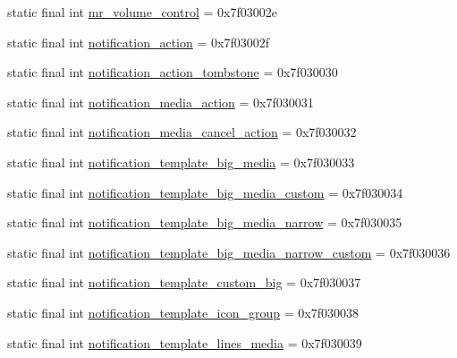 \begin{CompactItemize}
\item 
static final int \hyperlink{classandroid_1_1support_1_1mediacompat_1_1_r_1_1layout_bd3e479579173693faaa0370adeff515}{mr\_\-volume\_\-control} = 0x7f03002e
\item 
static final int \hyperlink{classandroid_1_1support_1_1mediacompat_1_1_r_1_1layout_29c15522984b36895767ca04e42ee8aa}{notification\_\-action} = 0x7f03002f
\item 
static final int \hyperlink{classandroid_1_1support_1_1mediacompat_1_1_r_1_1layout_3faaaaee1a8db772f7153dc113293cde}{notification\_\-action\_\-tombstone} = 0x7f030030
\item 
static final int \hyperlink{classandroid_1_1support_1_1mediacompat_1_1_r_1_1layout_12edbac3524e734d9030eb3c27d2622e}{notification\_\-media\_\-action} = 0x7f030031
\item 
static final int \hyperlink{classandroid_1_1support_1_1mediacompat_1_1_r_1_1layout_2954b200f3e663f1c2e1a43b394c9f36}{notification\_\-media\_\-cancel\_\-action} = 0x7f030032
\item 
static final int \hyperlink{classandroid_1_1support_1_1mediacompat_1_1_r_1_1layout_fdd746cb701ba907544b831af7ba0d37}{notification\_\-template\_\-big\_\-media} = 0x7f030033
\item 
static final int \hyperlink{classandroid_1_1support_1_1mediacompat_1_1_r_1_1layout_1298e724ec87dcc05ac1122d5ba857e9}{notification\_\-template\_\-big\_\-media\_\-custom} = 0x7f030034
\item 
static final int \hyperlink{classandroid_1_1support_1_1mediacompat_1_1_r_1_1layout_0d9d9e6ebfd8ecb552506391a00aac00}{notification\_\-template\_\-big\_\-media\_\-narrow} = 0x7f030035
\item 
static final int \hyperlink{classandroid_1_1support_1_1mediacompat_1_1_r_1_1layout_1168a77f40ed3c9d05cf7045d90b005f}{notification\_\-template\_\-big\_\-media\_\-narrow\_\-custom} = 0x7f030036
\item 
static final int \hyperlink{classandroid_1_1support_1_1mediacompat_1_1_r_1_1layout_8c6c9a9f12c4f255c01595c9e2ab0259}{notification\_\-template\_\-custom\_\-big} = 0x7f030037
\item 
static final int \hyperlink{classandroid_1_1support_1_1mediacompat_1_1_r_1_1layout_ae7b39339a1e8302370f528e52c1ef13}{notification\_\-template\_\-icon\_\-group} = 0x7f030038
\item 
static final int \hyperlink{classandroid_1_1support_1_1mediacompat_1_1_r_1_1layout_35904d5485334a41a8922daac66a9acc}{notification\_\-template\_\-lines\_\-media} = 0x7f030039

\end{CompactItemize}
